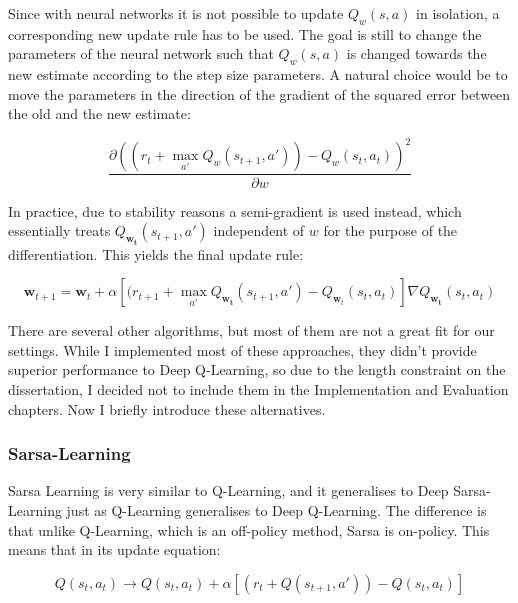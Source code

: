 Since with neural networks it is not possible to update $Q_w(s, a)$ in isolation, a corresponding new update rule has to be used. The goal is still to change the parameters of the neural network such that $Q_w(s, a)$ is changed towards the new estimate according to the step size parameters. A natural choice would be to move the parameters in the direction of the gradient of the squared error between the old and the new estimate:

$$\frac{\partial (( r_t + \max_{a'} Q_w(s_{t+1}, a')) - Q_w(s_t,a_t))^2}{\partial w}$$


In practice, due to stability reasons  a semi-gradient is used instead, which essentially treats $Q_{\mathbf{w_t}}(s_{t+1}, a')$ independent of $w$ for the purpose of the differentiation. This yields the final update rule:


\begin{equation} \label{eq:deep-q-learning-update-with-semi-gradient}
\mathbf{w}_{t+1} = \mathbf{w}_t + \alpha[( r_{t+1}+ \max_{a'} Q_{\mathbf{w_t}}(s_{t+1}, a') - Q_{\mathbf{w}_t}(s_t,a_t)]\nabla Q_{\mathbf{w_t}}(s_{t}, a_t)
\end{equation}



There are several other algorithms, but most of them are not a great fit for our settings. While I implemented most of these approaches, they didn't provide superior performance to Deep Q-Learning, so due to the length constraint on the dissertation, I decided not to include them in the Implementation and Evaluation chapters. Now I briefly introduce these alternatives. 

\subsubsection{Sarsa-Learning}

Sarsa Learning is very similar to Q-Learning, and it generalises to Deep Sarsa-Learning just as Q-Learning generalises to Deep Q-Learning. The difference is that unlike Q-Learning, which is an off-policy method, Sarsa is on-policy. This means that in its update equation:

\begin{equation} \label{eq:sarsa-learningUpdate}
Q(s_t,a_t) \longrightarrow Q(s_t,a_t) + \alpha[( r_t + Q(s_{t+1}, a')) - Q(s_t,a_t)]
\end{equation}

